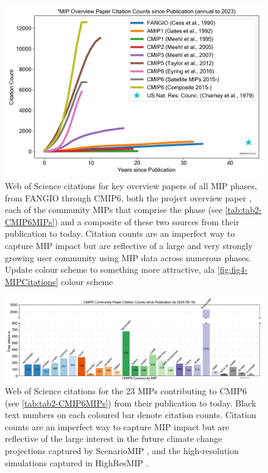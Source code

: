 \documentclass[gmd, preprint]{copernicus}
\def\cred#1{{\color{red}#1}}
\begin{document}
\begin{figure}
    \centering
    \includegraphics[width=1\linewidth]{240916T171314_CMIPOverviewPaperCitations-Counts-3.png}
    \caption{Web of Science citations for key overview papers of all MIP phases, from FANGIO \citep{cess_intercomparison_1990} through CMIP6, both the project overview paper \citep{eyring_overview_2016}, each of the community MIPs that comprise the phase (see \autoref{tab:tab2-CMIP6MIPs}) and a composite of these two sources from their publication to today. Citation counts are an imperfect way to capture MIP impact but are reflective of a large and very strongly growing user community using MIP data across numerous phases. \cred{Update colour scheme to something more attractive, ala \autoref{fig:fig4-MIPCitations} colour scheme}}
    \label{fig:fig3-MIPPhaseCitations}
\end{figure}

\begin{figure}
    \centering
    \includegraphics[width=\textwidth]{240916T171314_CMIPOverviewPaperCitations-Counts-2b-bar.png}
    \caption{Web of Science citations for the 23 MIPs contributing to CMIP6 (see \autoref{tab:tab2-CMIP6MIPs}) from their publication to today. Black text numbers on each coloured bar denote citation counts. Citation counts are an imperfect way to capture MIP impact but are reflective of the large interest in the future climate change projections captured by ScenarioMIP \citep{oneill_scenario_2016}, and the high-resolution simulations captured in HighResMIP \citep{haarsma_high_2016}.}
    \label{fig:fig4-MIPCitations}
\end{figure}
\end{document}
